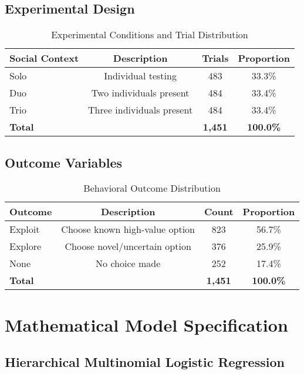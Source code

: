 \documentclass[11pt,a4paper]{article}
\begin{document}
\subsection{Experimental Design}
\begin{table}[H]
\centering
\caption{Experimental Conditions and Trial Distribution}
\begin{tabular}{lccc}
\toprule
\textbf{Social Context} & \textbf{Description} & \textbf{Trials} & \textbf{Proportion} \\
\midrule
Solo & Individual testing & 483 & 33.3\% \\
Duo & Two individuals present & 484 & 33.4\% \\
Trio & Three individuals present & 484 & 33.4\% \\
\midrule
\textbf{Total} & & \textbf{1,451} & \textbf{100.0\%} \\
\bottomrule
\end{tabular}
\end{table}

\subsection{Outcome Variables}
\begin{table}[H]
\centering
\caption{Behavioral Outcome Distribution}
\begin{tabular}{lccc}
\toprule
\textbf{Outcome} & \textbf{Description} & \textbf{Count} & \textbf{Proportion} \\
\midrule
Exploit & Choose known high-value option & 823 & 56.7\% \\
Explore & Choose novel/uncertain option & 376 & 25.9\% \\
None & No choice made & 252 & 17.4\% \\
\midrule
\textbf{Total} & & \textbf{1,451} & \textbf{100.0\%} \\
\bottomrule
\end{tabular}
\end{table}

\section{Mathematical Model Specification}

\subsection{Hierarchical Multinomial Logistic Regression}
\end{document}

